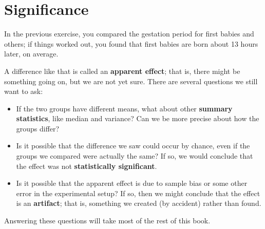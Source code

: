 \documentclass[12pt]{book}
\begin{document}
\section{Significance}

In the previous exercise, you compared the gestation period for first
babies and others; if things worked out, you found that first
babies are born about 13 hours later, on average.

A difference like that is called an {\bf apparent effect}; that is,
there might be something going on, but we are not yet sure.  There are
several questions we still want to ask:

\begin{itemize}

\item If the two groups have different means, what about other {\bf
  summary statistics}, like median and variance?  Can we be more
  precise about how the groups differ?

\item Is it possible that the difference we saw could occur by chance,
  even if the groups we compared were actually the same?  If so,
  we would conclude that the effect was not {\bf statistically
    significant}.

\item Is it possible that the apparent effect is due to sample bias or
  some other error in the experimental setup?  If so, then we might
  conclude that the effect is an {\bf artifact}; that is, something we
  created (by accident) rather than found. 

\end{itemize}

Answering these questions will take most of the rest of this book.
\end{document}
